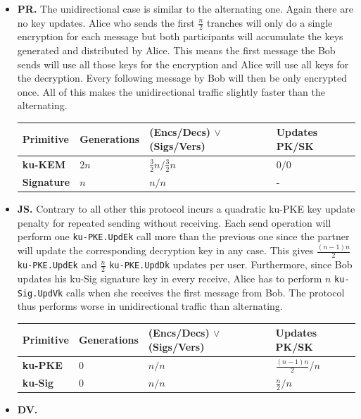 \documentclass[11pt,a4paper,twoside,openright,bibliography=totoc]{scrbook}
\begin{document}
\begin{itemize}
\item \textbf{PR.} The unidirectional case is similar to the alternating
  one. Again there are no key updates. Alice who sends the first
  $\frac{n}{2}$ tranches will only do a single encryption for
  each message but both participants will accumulate the keys
  generated and distributed by Alice. This means the first
  message the Bob sends will use all those keys for the encryption
  and Alice will use all keys for the decryption. Every following
  message by Bob will then be only encrypted once. All of this
  makes the unidirectional traffic slightly faster than the alternating.
  \begin{center}
    \begin{tabular}{ | l | l | l | l |}
    \hline
    Primitive & Generations & (Encs/Decs) $\vee$ (Sigs/Vers) & Updates PK/SK \\ \hline
    \textbf{ku-KEM} & $2n$ & $\frac{3}{2}n/\frac{3}{2}n$ & $0/0$ \\ \hline
    \textbf{Signature} & $n$ & $n/n$ & - \\  
    \hline
    \end{tabular}
  \end{center}
\item  \textbf{JS.} Contrary to all other this protocol incurs a
  quadratic ku-PKE key update penalty for repeated sending without receiving.
  Each send operation will perform one \texttt{ku-PKE.UpdEk} call more than the previous
  one since the partner will update the corresponding decryption key
  in any case. This gives $\frac{(n-1)n}{2}$ \texttt{ku-PKE.UpdEk} and
  $\frac{n}{2}$ \texttt{ku-PKE.UpdDk} updates per user. Furthermore,
  since Bob updates his ku-Sig signature key in every receive, Alice
  has to perform $n$ \texttt{ku-Sig.UpdVk} calls when she receives the
  first message from Bob. The protocol thus performs worse in unidirectional
  traffic than alternating.
  \begin{center}
    \begin{tabular}{ | l | l | l | l |}
    \hline
    Primitive & Generations & (Encs/Decs) $\vee$ (Sigs/Vers) & Updates PK/SK \\ \hline
    \textbf{ku-PKE} & $0$ & $n/n$ & $\frac{(n-1)n}{2}/n$ \\ \hline
    \textbf{ku-Sig} & $0$ & $n/n$ & $\frac{n}{2}/n$ \\  
    \hline
    \end{tabular}
  \end{center}
\item \textbf{DV.}
\end{itemize}
\end{document}

